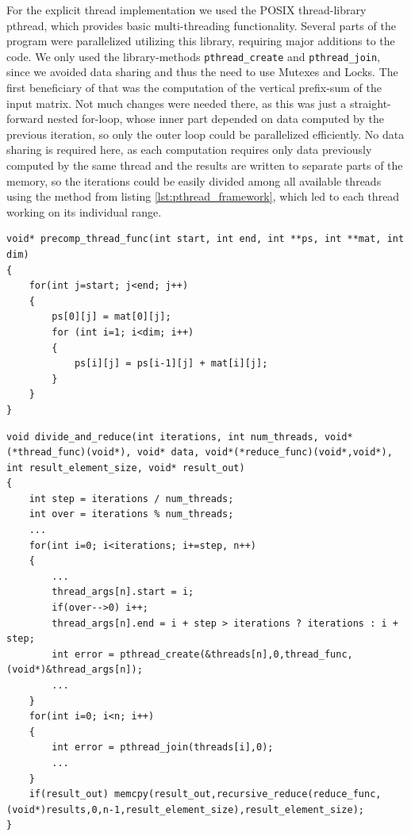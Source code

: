 \documentclass[conference]{IEEEtran}
\begin{document}
For the explicit thread implementation we used the POSIX thread-library pthread, which provides basic multi-threading functionality. Several parts of the program were parallelized utilizing this library, requiring major additions to the code. We only used the library-methods \texttt{pthread\_create} and \texttt{pthread\_join}, since we avoided data sharing and thus the need to use Mutexes and Locks.
The first beneficiary of that was the computation of the vertical prefix-sum of the input matrix. Not much changes were needed there, as this was just a straight-forward nested for-loop, whose inner part depended on data computed by the previous iteration, so only the outer loop could be parallelized efficiently. No data sharing is required here, as each computation requires only data previously computed by the same thread and the results are written to separate parts of the memory, so the iterations could be easily divided among all available threads using the method from listing \ref{lst:pthread_framework}, which led to each thread working on its individual range.

\begin{center}
   \begin{lstlisting}[captionpos=b, caption=pthread: Parallel Matrix Pre-Computation of the Vertical Sum (simplified) - the variables \texttt{start} and \texttt{end} are used to equally divide the work among all available threads and to specify where the work of a thread begins and ends., label=lst:pthread_precomp]
void* precomp_thread_func(int start, int end, int **ps, int **mat, int dim)
{
    for(int j=start; j<end; j++)
    {
        ps[0][j] = mat[0][j];
        for (int i=1; i<dim; i++)
        {
            ps[i][j] = ps[i-1][j] + mat[i][j];
        }
    }
}
   \end{lstlisting}
\end{center}

\begin{center}
   \begin{lstlisting}[captionpos=b, caption=pthread: Framework used for dividing iterations among a fixed number of threads and reducing the results afterwards, label=lst:pthread_framework]
void divide_and_reduce(int iterations, int num_threads, void*(*thread_func)(void*), void* data, void*(*reduce_func)(void*,void*), int result_element_size, void* result_out)
{
    int step = iterations / num_threads;
    int over = iterations % num_threads;
    ...
    for(int i=0; i<iterations; i+=step, n++)
    {
        ...
        thread_args[n].start = i;
        if(over-->0) i++;
        thread_args[n].end = i + step > iterations ? iterations : i + step;
        int error = pthread_create(&threads[n],0,thread_func,(void*)&thread_args[n]);
        ...
    }
    for(int i=0; i<n; i++)
    {
        int error = pthread_join(threads[i],0);
        ...
    }
    if(result_out) memcpy(result_out,recursive_reduce(reduce_func,(void*)results,0,n-1,result_element_size),result_element_size);
}
   \end{lstlisting}
\end{center}
\end{document}
